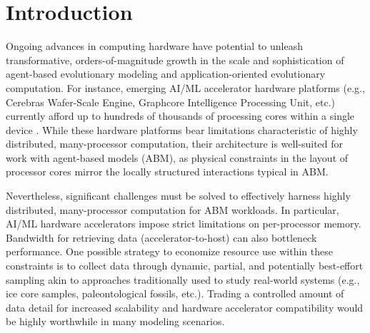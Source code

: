 \section{Introduction} \label{sec:introduction}

Ongoing advances in computing hardware have potential to unleash transformative, orders-of-magnitude growth in the scale and sophistication of agent-based evolutionary modeling and application-oriented evolutionary computation.
For instance, emerging AI/ML accelerator hardware platforms (e.g., Cerebras Wafer-Scale Engine, Graphcore Intelligence Processing Unit, etc.) currently afford up to hundreds of thousands of processing cores within a single device \citep{lauterbach2021path,jia2019dissecting}.
While these hardware platforms bear limitations characteristic of highly distributed, many-processor computation, their architecture is well-suited for work with agent-based models (ABM), as physical constraints in the layout of processor cores mirror the locally structured interactions typical in ABM.

Nevertheless, significant challenges must be solved to effectively harness highly distributed, many-processor computation for ABM workloads.
In particular, AI/ML hardware accelerators impose strict limitations on per-processor memory.
Bandwidth for retrieving data (accelerator-to-host) can also bottleneck performance.
One possible strategy to economize resource use within these constraints is to collect data through dynamic, partial, and potentially best-effort sampling akin to approaches traditionally used to study real-world systems (e.g., ice core samples, paleontological fossils, etc.).
Trading a controlled amount of data detail for increased scalability and hardware accelerator compatibility would be highly worthwhile in many modeling scenarios.

